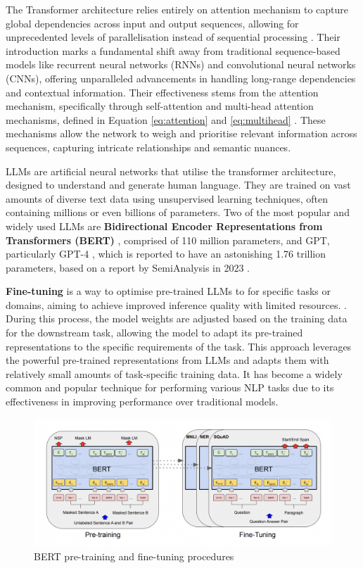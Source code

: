 The Transformer architecture relies entirely on attention mechanism to capture global dependencies across input and output sequences, allowing for unprecedented levels of parallelisation instead of sequential processing \cite{vaswani-2023-attention}. Their introduction marks a fundamental shift away from traditional sequence-based models like recurrent neural networks (RNNs) and convolutional neural networks (CNNs), offering unparalleled advancements in handling long-range dependencies and contextual information. Their effectiveness stems from the attention mechanism, specifically through self-attention and multi-head attention mechanisms, defined in Equation \eqref{eq:attention} and \eqref{eq:multihead} \cite{vaswani-2023-attention}. These mechanisms allow the network to weigh and prioritise relevant information across sequences, capturing intricate relationships and semantic nuances.

LLMs are artificial neural networks that utilise the transformer architecture, designed to understand and generate human language. They are trained on vast amounts of diverse text data using unsupervised learning techniques, often containing millions or even billions of parameters. Two of the most popular and widely used LLMs are \textbf{Bidirectional Encoder Representations from Transformers (BERT)} \cite{devlin-2019-bert}, comprised of 110 million parameters, and GPT, particularly GPT-4 \cite{openai-2024-gpt4}, which is reported to have an astonishing 1.76 trillion parameters, based on a report by SemiAnalysis in 2023 \cite{semianalysis-gpt4}.

\textbf{Fine-tuning} is a way to optimise pre-trained LLMs to for specific tasks or domains, aiming to achieve improved inference quality with limited resources. \cite{oracle-finetuning-blog}. During this process, the model weights are adjusted based on the training data for the downstream task, allowing the model to adapt its pre-trained representations to the specific requirements of the task. This approach leverages the powerful pre-trained representations from LLMs and adapts them with relatively small amounts of task-specific training data. It has become a widely common and popular technique for performing various NLP tasks due to its effectiveness in improving performance over traditional models.

\begin{figure}[htbp]
    \centering
    \includegraphics[width=0.9\linewidth]{images/bert_finetuning.png}
    \caption{BERT pre-training and fine-tuning procedures \cite{devlin-2019-bert}}
    \label{fig:bert_finetuning}
\end{figure}

